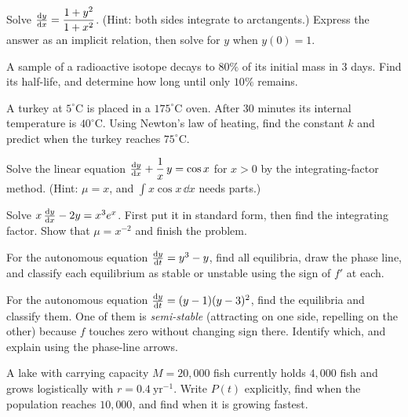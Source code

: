 \begin{exercise}
Solve $\frac{\mathrm{d} y}{\mathrm{d} x} = \dfrac{1+y^2}{1+x^2}$. (Hint: both sides integrate to arctangents.)
Express the answer as an implicit relation, then solve for $y$ when $y(0)=1$.
\end{exercise}

\begin{exercise}
A sample of a radioactive isotope decays to $80\%$ of its initial mass in $3$ days.
Find its half-life, and determine how long until only $10\%$ remains.
\end{exercise}

\begin{exercise}
A turkey at $5^\circ$C is placed in a $175^\circ$C oven. After $30$ minutes its
internal temperature is $40^\circ$C. Using Newton's law of heating, find the
constant $k$ and predict when the turkey reaches $75^\circ$C.
\end{exercise}

\begin{exercise}
Solve the linear equation $\frac{\mathrm{d} y}{\mathrm{d} x} + \dfrac{1}{x}\,y = \cos x$ for $x>0$ by the
integrating-factor method. (Hint: $\mu = x$, and $\int x\cos x\,\dd x$ needs parts.)
\end{exercise}

\begin{exercise}
Solve $x\,\frac{\mathrm{d} y}{\mathrm{d} x} - 2y = x^3 e^{x}$. First put it in standard form, then find the
integrating factor. Show that $\mu = x^{-2}$ and finish the problem.
\end{exercise}

\begin{exercise}
For the autonomous equation $\frac{\mathrm{d} y}{\mathrm{d} t} = y^3 - y$, find all equilibria, draw the
phase line, and classify each equilibrium as stable or unstable using the sign of
$f'$ at each.
\end{exercise}

\begin{exercise}
For the autonomous equation $\frac{\mathrm{d} y}{\mathrm{d} t} = (y-1)(y-3)^2$, find the equilibria and
classify them. One of them is \emph{semi-stable} (attracting on one side, repelling
on the other) because $f$ touches zero without changing sign there. Identify which,
and explain using the phase-line arrows.
\end{exercise}

\begin{exercise}
A lake with carrying capacity $M=20{,}000$ fish currently holds $4{,}000$ fish and
grows logistically with $r=0.4\ \text{yr}^{-1}$. Write $P(t)$ explicitly, find when
the population reaches $10{,}000$, and find when it is growing fastest.
\end{exercise}

